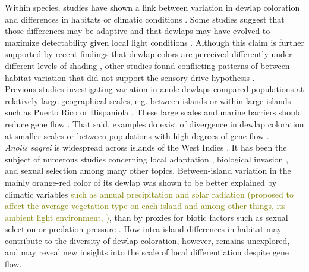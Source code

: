 Within species, studies have shown a link between variation in dewlap coloration and differences in habitats or climatic conditions \citep{Macedonia2001, Leal2002, Thorpe2002, Thorpe2002a, Leal2004, Vanhooydonck2009, Ng2012, Ng2013, Ng2016, Vanhooydonck2009, Driessens2017}. Some studies suggest that those differences may be adaptive and that dewlaps may have evolved to maximize detectability given local light conditions \citep{Fleishman2001, Leal2002, Leal2004}. Although this claim is further supported by recent findings that dewlap colors are perceived differently under different levels of shading \citep{Fleishman2020}, other studies found conflicting patterns of between-habitat variation that did not support the sensory drive hypothesis \citep{Fleishman2009, Ng2012, Macedonia2014}.\\ 

Previous studies investigating variation in anole dewlaps compared populations at relatively large geographical scales, e.g. between islands \citep{Vanhooydonck2009, Driessens2017} or within large islands such as Puerto Rico \citep{Leal2004} or Hispaniola \citep{Ng2012, Ng2016}. These large scales and marine barriers should reduce gene flow \citep{Ng2011, Lambert2013, Richardson2014, Ng2017}. That said, examples do exist of divergence in dewlap coloration at smaller scales or between populations with high degrees of gene flow \citep{Thorpe2002, Thorpe2002a, Stapley2011, Ng2016}.\\

\textit{Anolis sagrei} is widespread across islands of the West Indies \citep{Reynolds2020}. It has been the subject of numerous studies concerning local adaptation \citep{Losos1994, Losos1997a, Losos2001, Kolbe2012}, biological invasion \citep{Kolbe2008}, and sexual selection \citep{Tokarz2002, Tokarz2005, Tokarz2006, Driessens2014, Steffen2014, Driessens2015} among many other topics. Between-island variation in the mainly orange-red color of its dewlap was shown to be better explained by climatic variables \textcolor{olive}{such as annual precipitation and solar radiation (proposed to affect the average vegetation type on each island and among other things, its ambient light environment, \citealt{Driessens2017})},  than by proxies for biotic factors such as sexual selection or predation pressure \citep{Vanhooydonck2009, Baeckens2018}. How intra-island differences in habitat may contribute to the diversity of dewlap coloration, however, remains unexplored, and may reveal new insights into the scale of local differentiation despite gene flow.\\

